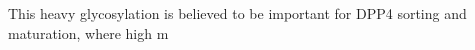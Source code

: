 This heavy glycosylation is believed to be important for DPP4 sorting and maturation, where high m\cite{Matter_1991}